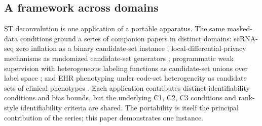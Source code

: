 \subsection{A framework across domains}

ST deconvolution is one application of a portable apparatus. The
same masked-data conditions ground a series of companion papers in
distinct domains: scRNA-seq zero inflation as a binary
candidate-set instance \citep{towell2026scrnacoarsening};
local-differential-privacy mechanisms as randomized candidate-set
generators \citep{towell2026dpcoarsening}; programmatic weak
supervision with heterogeneous labeling functions as
candidate-set unions over label space
\citep{towell2026weaksupcoarsening}; and EHR phenotyping under
code-set heterogeneity as candidate sets of clinical phenotypes
\citep{towell2026phenotypecoarsening}. Each application
contributes distinct identifiability conditions and bias bounds,
but the underlying C1, C2, C3 conditions and rank-style
identifiability criteria are shared. The portability is
itself the principal contribution of the series; this paper
demonstrates one instance.
